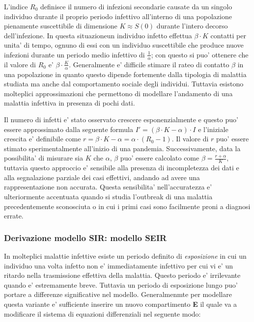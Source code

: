 L'indice $R_0$ definisce il numero di infezioni secondarie causate da un singolo individuo durante il proprio periodo infettivo 
all'interno di una popolazione pienamente suscettibile di dimensione $K \approx S(0)$ durante l'intero decorso dell'infezione. In 
questa situazioneun individuo infetto effettua $\beta \cdot K$ contatti per unita' di tempo, ognuno di essi con un individuo suscettibile 
che produce nuove infezioni durante un periodo medio infettivo di $\frac{1}{\alpha}$; con questo si puo' ottenere che il valore di $R_0$ e' 
$\beta \cdot \frac{K}{\alpha}$. Generalmente e' difficile stimare il rateo di contatto $\beta$ in una popolazione in quanto questo dipende fortemente 
dalla tipologia di malattia studiata ma anche dal comportamento sociale degli individui. Tuttavia esistono molteplici approssimazioni 
che permettono di modellare l'andamento di una malattia infettiva in presenza di pochi dati. 

Il numero di infetti e' stato osservato crescere esponenzialmente e questo puo' essere approssimato dalla seguente formula $I' = (\beta \cdot K - \alpha) \cdot I$
e l'iniziale crescita e' definibile come $r = \beta \cdot K - \alpha = \alpha \cdot (R_0 - 1)$. Il valore di $r$ puo' essere stimato sperimentalmente 
all'inizio di una pandemia. Successivamente, data la possibilita' di misurare sia $K$ che $\alpha$, $\beta$ puo' essere calcolato come 
$\beta = \frac{r + \alpha}{K}$, tuttavia questo approccio e' sensibile alla presenza di incompletezza dei dati e alla segnalazione parziale dei casi effettivi, andando 
ad avere una rappresentazione non accurata. Questa sensibilita' nell'accuratezza e' ulteriormente accentuata quando si studia l'outbreak di una malattia 
precedentemente sconosciuta o in cui i primi casi sono facilmente proni a diagnosi errate.   

\subsubsection{Derivazione modello SIR: modello SEIR}
In molteplici malattie infettive esiste un periodo definito di \emph{esposizione} \cite{wiki:Incubation_period} in cui un individuo una volta infetto non 
e' immediatamente infettivo per cui vi e' un ritardo nella trasmissione effettiva della malattia. Questo periodo e' irrilevante quando e' estremamente breve. 
Tuttavia un periodo di esposizione lungo puo' portare a differenze significative nel modello. Generalmenmte per modellare questa variante e' sufficiente 
inserire un nuovo compartimento \textbf{E} il quale va a modificare il sistema di equazioni differenziali nel seguente modo:

